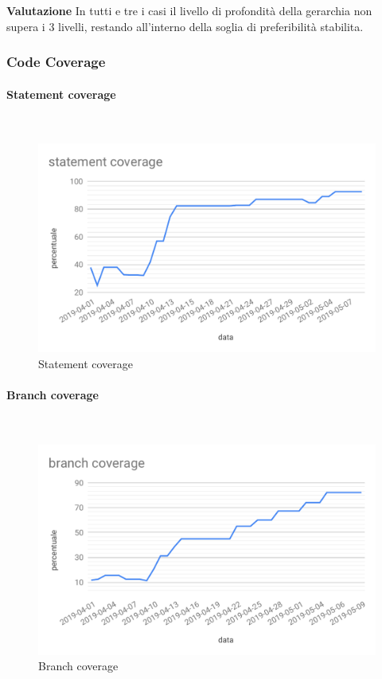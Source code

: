 \textbf{Valutazione}
In tutti e tre i casi il livello di profondità della gerarchia non supera i 3 livelli, restando all'interno della soglia di preferibilità stabilita. 




\subsubsection{Code Coverage}
\paragraph{Statement coverage}\mbox{}\\
\begin{figure}[H]
	\centering
	\includegraphics[scale=0.7]{res/images/RA/statement-coverage.pdf}
	\caption{Statement coverage}
\end{figure}	
\paragraph{Branch coverage}\mbox{}\\
\begin{figure}[H]
	\centering
	\includegraphics[scale=0.7]{res/images/RA/branch-coverage.pdf}
	\caption{Branch coverage}
\end{figure}
